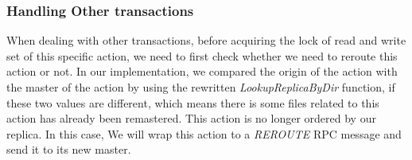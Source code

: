 \subsubsection{Handling Other transactions}
When dealing with other transactions, before acquiring the lock of read and write set of this specific action, we need to first check whether we need to reroute this action or not. In our implementation, we compared the origin of the action with the master of the action by using the rewritten \emph{LookupReplicaByDir} function, if these two values are different, which means there is some files related to this action has already been remastered. This action is no longer ordered by our replica. In this case, We will wrap this action to a \emph{REROUTE} RPC message and send it to its new master.

